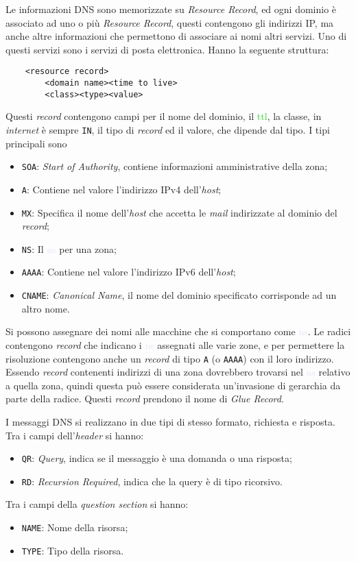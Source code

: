 \documentclass{article}
\numberwithin{equation}{subsection}
\begin{document}
Le informazioni \textcolor{Mahogany}{DNS} sono memorizzate su \textit{Resource Record}, ed ogni dominio è associato ad uno o più \textit{Resource Record}, questi contengono gli indirizzi \textcolor{Bittersweet}{IP}, ma anche 
altre informazioni che permettono di associare ai nomi altri servizi. Uno di questi servizi sono i servizi di posta elettronica. Hanno la seguente struttura:
\begin{verbatim}
    <resource record>
        <domain name><time to live>
        <class><type><value>
\end{verbatim}
Questi \textit{record} contengono campi per il nome del dominio, il \textcolor{LimeGreen}{ttl}, la classe, in \textit{internet} è sempre \texttt{IN}, il tipo di \textit{record} ed il valore, che dipende dal tipo. I tipi principali sono 
\begin{itemize}
    \item \texttt{SOA}: \textit{Start of Authority}, contiene informazioni amministrative della zona;
    \item \texttt{A}: Contiene nel valore l'indirizzo \textcolor{BurntOrange}{IPv4} dell'\textit{host};
    \item \texttt{MX}: Specifica il nome dell'\textit{host} che accetta le \textit{mail} indirizzate al dominio del \textit{record};
    \item \texttt{NS}: Il \textcolor{Lavender}{ns} per una zona;
    \item \texttt{AAAA}: Contiene nel valore l'indirizzo \textcolor{OliveGreen}{IPv6} dell'\textit{host};
    \item \texttt{CNAME}: \textit{Canonical Name}, il nome del dominio specificato corrisponde ad un altro nome. 
\end{itemize}

Si possono assegnare dei nomi alle macchine che si comportano come \textcolor{Lavender}{ns}. 
Le radici contengono \textit{record} che indicano i \textcolor{Lavender}{ns} assegnati alle varie zone, e per permettere la risoluzione contengono anche un \textit{record} di tipo \texttt{A} (o \texttt{AAAA}) con il loro indirizzo. Essendo \textit{record} contenenti indirizzi di una zona dovrebbero trovarsi nel \textcolor{Lavender}{ns} relativo a quella zona, quindi questa può essere considerata un'invasione di gerarchia da parte della radice. Questi \textit{record} prendono il nome di \textit{Glue Record}. 

I messaggi \textcolor{Mahogany}{DNS} si realizzano in due tipi di stesso formato, richiesta e risposta. Tra i campi dell'\textit{header} si hanno:
\begin{itemize}
    \item \texttt{QR}: \textit{Query}, indica se il messaggio è una domanda o una risposta;
    \item \texttt{RD}: \textit{Recursion Required}, indica che la query è di tipo ricorsivo.
\end{itemize}
Tra i campi della \textit{question section} si hanno:
\begin{itemize}
    \item \texttt{NAME}: Nome della risorsa;
    \item \texttt{TYPE}: Tipo della risorsa.
\end{itemize}
\end{document}
